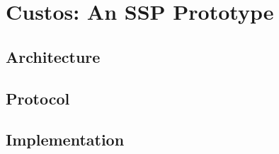 \chapter{Custos: An SSP Prototype}
\label{chap:custos}

\section{Architecture}
\section{Protocol}
\section{Implementation}

